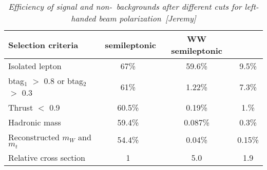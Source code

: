         \begin{table}[H]
        \begin{center}
        \begin{tabular}{l c c c}
        \hline
	Selection criteria & \ttbar\ semileptonic  & WW semileptonic &  \bbbar  \\
	\hline
	Isolated lepton & 67\% & 59.6\% & 9.5\% \\
	btag$_1$ $>$ 0.8 or btag$_2$ $>$ 0.3 & 61\% & 1.22\% & 7.3\% \\
	Thrust $<$ 0.9 & 60.5\% & 0.19\% & 1.\% \\
	Hadronic mass & 59.4\% & 0.087\% & 0.3\% \\
	Reconstructed $m_W$ and $m_t$ & 54.4\% & 0.04\% & 0.15\% \\
		\hline
	Relative cross section & 1 & 5.0 & 1.9 \\
        \hline
        \end{tabular}
        \end{center}
        \caption{\sl Efficiency of signal and non-\ttbar\ backgrounds after different cuts for left-handed beam polarization~[Jeremy]}
        \label{table:ttbarselection}
        \end{table}
